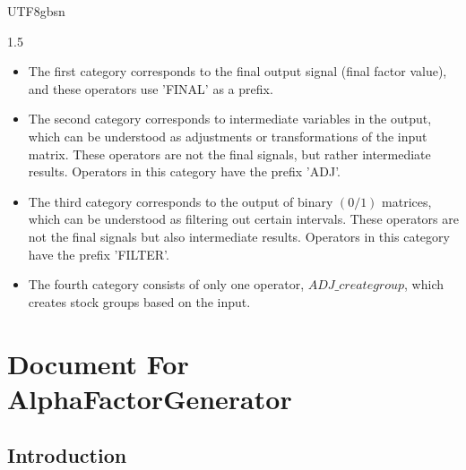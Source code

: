 \documentclass{article}
\begin{document}
\begin{CJK}{UTF8}{gbsn}
\begin{spacing}{1.5}

\begin{itemize}
\item[*] The first category corresponds to the final output signal (final factor value), and these operators use 'FINAL' as a prefix.
\item[*] The second category corresponds to intermediate variables in the output, which can be understood as adjustments or transformations of the input matrix. These operators are not the final signals, but rather intermediate results. Operators in this category have the prefix 'ADJ'.
\item[*] The third category corresponds to the output of binary $(0/1)$ matrices, which can be understood as filtering out certain intervals. These operators are not the final signals but also intermediate results. Operators in this category have the prefix 'FILTER'.
\item[*] The fourth category consists of only one operator, $ADJ\_creategroup$, which creates stock groups based on the input.
\end{itemize}








\section{Document For AlphaFactorGenerator}

\subsection{Introduction}



\end{spacing}
\end{CJK}
\end{document}
